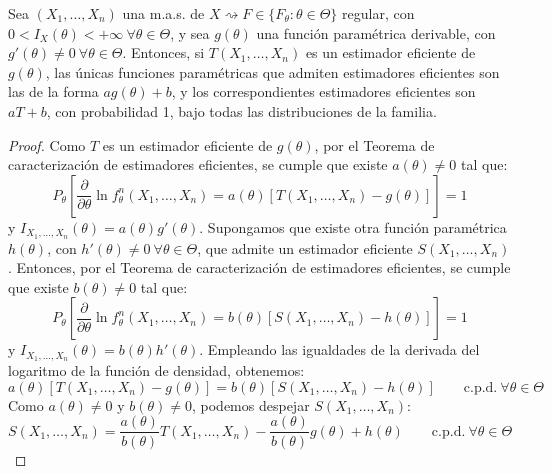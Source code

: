 \begin{coro}
    Sea $(X_1, \ldots, X_n)$ una m.a.s. de $X \rightsquigarrow F \in \{F_\theta : \theta \in \Theta\}$ regular, con $0 < I_X(\theta) < +\infty\ \forall \theta \in \Theta$, y sea $g(\theta)$ una función paramétrica derivable, con $g'(\theta) \neq 0\ \forall \theta \in \Theta$. Entonces, si $T(X_1, \ldots, X_n)$ es un estimador eficiente de $g(\theta)$, las únicas funciones paramétricas que admiten estimadores eficientes son las de la forma $ag(\theta) + b$, y los correspondientes estimadores eficientes son $aT + b$, con probabilidad 1, bajo todas las distribuciones de la familia.

    \begin{proof}
        Como $T$ es un estimador eficiente de $g(\theta)$, por el Teorema de caracterización de estimadores eficientes, se cumple que existe $a(\theta) \neq 0$ tal que:
        \begin{equation*}
            P_\theta\left[\dfrac{\partial}{\partial\theta}\ln f^n_\theta(X_1,\ldots,X_n)=a(\theta)[T(X_1,\ldots,X_n)-g(\theta)]\right]=1
        \end{equation*}
        y $I_{X_1,\ldots,X_n}(\theta)=a(\theta)g'(\theta)$. Supongamos que existe otra función paramétrica $h(\theta)$, con $h'(\theta) \neq 0\ \forall \theta \in \Theta$, que admite un estimador eficiente $S(X_1, \ldots, X_n)$. Entonces, por el Teorema de caracterización de estimadores eficientes, se cumple que existe $b(\theta) \neq 0$ tal que:
        \begin{equation*}
            P_\theta\left[\dfrac{\partial}{\partial\theta}\ln f^n_\theta(X_1,\ldots,X_n)=b(\theta)[S(X_1,\ldots,X_n)-h(\theta)]\right]=1
        \end{equation*}
        y $I_{X_1,\ldots,X_n}(\theta)=b(\theta)h'(\theta)$. Empleando las igualdades de la derivada del logaritmo de la función de densidad, obtenemos:
        \begin{equation*}
            a(\theta)[T(X_1,\ldots,X_n)-g(\theta)] = b(\theta)[S(X_1,\ldots,X_n)-h(\theta)]\qquad \text{c.p.d.} \ \forall \theta \in \Theta
        \end{equation*}
        Como $a(\theta) \neq 0$ y $b(\theta) \neq 0$, podemos despejar $S(X_1, \ldots, X_n)$:
        \begin{equation*}
            S(X_1, \ldots, X_n) = \frac{a(\theta)}{b(\theta)} T(X_1, \ldots, X_n) - \frac{a(\theta)}{b(\theta)} g(\theta) + h(\theta)\qquad \text{c.p.d.} \ \forall \theta \in \Theta
        \end{equation*}


\end{proof}
\end{coro}

